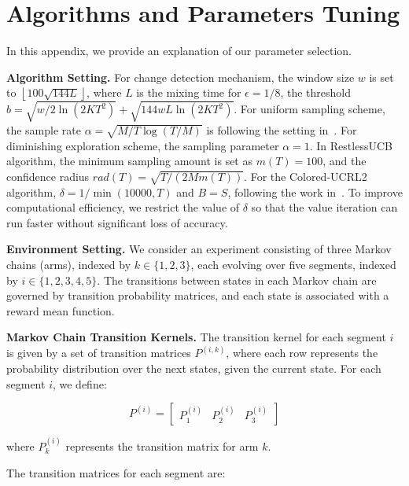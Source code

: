 \documentclass[twoside]{article}
\theoremstyle{plain}
\theoremstyle{definition}
\theoremstyle{remark}
\begin{document}
\section{Algorithms and Parameters Tuning}
\label{app:para}
In this appendix, we provide an explanation of our parameter selection. 


\textbf{Algorithm Setting.} For change detection mechanism, the window size $w$ is set to $\left\lfloor100\sqrt{144L}\right\rfloor$, where $L$ is the mixing time for $\epsilon=1/8$, the threshold $b = \sqrt{w/2\ln{(2KT^2)}} + \sqrt{144wL\ln{(2KT^2)}}$. For uniform sampling scheme, the sample rate $\alpha = \sqrt{M/T\log{(T/M)}}$ is following the setting in~\cite{liu2018change}. For diminishing exploration scheme, the sampling parameter $\alpha = 1$. In RestlessUCB algorithm, the minimum sampling amount is set as $m(T)=100$, and the confidence radius $rad(T)=\sqrt{T/(2Mm(T))}$. For the Colored-UCRL2 algorithm, $\delta=1/\min(10000,T)$ and $B=S$, following the work in~\cite{ortner2012regret}. To improve computational efficiency, we restrict the value of $\delta$ so that the value iteration can run faster without significant loss of accuracy. 

\textbf{Environment Setting.} We consider an experiment consisting of three Markov chains (arms), indexed by $k \in \{1,2,3\}$, each evolving over five segments, indexed by $i \in \{1,2,3,4,5\}$. The transitions between states in each Markov chain are governed by transition probability matrices, and each state is associated with a reward mean function.

\textbf{Markov Chain Transition Kernels. }
The transition kernel for each segment $i$ is given by a set of transition matrices $P^{(i,k)}$, where each row represents the probability distribution over the next states, given the current state.
For each segment $i$, we define:

\begin{equation}
P^{(i)} =
\begin{bmatrix}
P^{(i)}_1 & P^{(i)}_2 & P^{(i)}_3
\end{bmatrix}
\end{equation}

where $P^{(i)}_k$ represents the transition matrix for arm $k$.

The transition matrices for each segment are:
\end{document}
